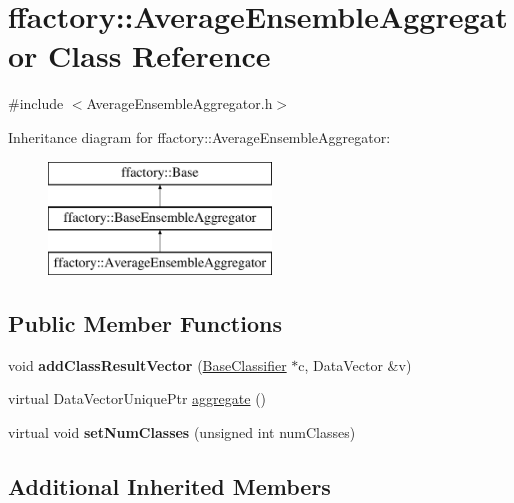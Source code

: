 \hypertarget{classffactory_1_1_average_ensemble_aggregator}{\section{ffactory\-:\-:Average\-Ensemble\-Aggregator Class Reference}
\label{classffactory_1_1_average_ensemble_aggregator}
}


{\ttfamily \#include $<$Average\-Ensemble\-Aggregator.\-h$>$}

Inheritance diagram for ffactory\-:\-:Average\-Ensemble\-Aggregator\-:\begin{figure}[H]
\begin{center}
\leavevmode
\includegraphics[height=3.000000cm]{classffactory_1_1_average_ensemble_aggregator}
\end{center}
\end{figure}
\subsection*{Public Member Functions}
\begin{DoxyCompactItemize}
\item 
\hypertarget{classffactory_1_1_average_ensemble_aggregator_a1f812408174d02496204067efa76b8d9}{void {\bfseries add\-Class\-Result\-Vector} (\hyperlink{classffactory_1_1_base_classifier}{Base\-Classifier} $\ast$c, Data\-Vector \&v)}\label{classffactory_1_1_average_ensemble_aggregator_a1f812408174d02496204067efa76b8d9}

\item 
virtual Data\-Vector\-Unique\-Ptr \hyperlink{classffactory_1_1_average_ensemble_aggregator_acfdd35393c0e5db156573a237a025f11}{aggregate} ()
\item 
\hypertarget{classffactory_1_1_average_ensemble_aggregator_a143fe19f5e807b6059b7d4bd25e29655}{virtual void {\bfseries set\-Num\-Classes} (unsigned int num\-Classes)}\label{classffactory_1_1_average_ensemble_aggregator_a143fe19f5e807b6059b7d4bd25e29655}

\end{DoxyCompactItemize}
\subsection*{Additional Inherited Members}


